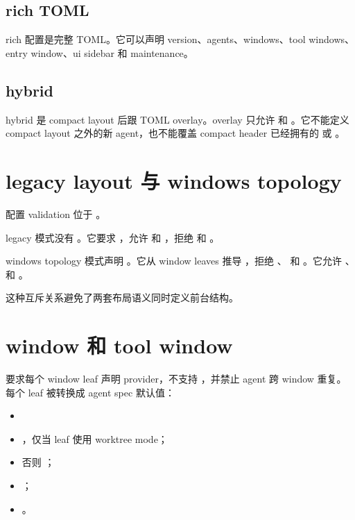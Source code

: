 \subsection{rich TOML}

rich 配置是完整 TOML。它可以声明 version、agents、windows、tool windows、entry window、ui sidebar 和 maintenance。

\subsection{hybrid}

hybrid 是 compact layout 后跟 TOML overlay。overlay 只允许  和 。它不能定义 compact layout 之外的新 agent，也不能覆盖 compact header 已经拥有的  或 。

\section{legacy layout 与 windows topology}

配置 validation 位于 。

legacy 模式没有 。它要求 ，允许  和 ，拒绝  和 。

windows topology 模式声明 。它从 window leaves 推导 ，拒绝 、 和 。它允许 、 和 。

这种互斥关系避免了两套布局语义同时定义前台结构。

\section{window 和 tool window}

 要求每个 window leaf 声明 provider，不支持 ，并禁止 agent 跨 window 重复。每个 leaf 被转换成 agent spec 默认值：

\begin{itemize}
  \item {}
  \item {}，仅当 leaf 使用 worktree mode；
  \item 否则 ；
  \item {}；
  \item {}。
\end{itemize}

